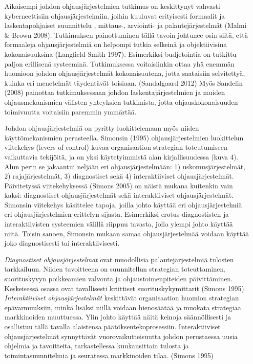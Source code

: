 \documentclass[12pt,a4paper,oneside,pdftex]{report}
\begin{document}
Aikaisempi johdon ohjausjärjestelmien tutkimus on keskittynyt vahvasti kyberneettisiin ohjausjärjestelmiin, joihin kuuluvat erityisesti formaalit ja laskentapohjaiset suunnittelu ,  mittaus-, arviointi- ja palautejärjestelmät (Malmi & Brown 2008). Tutkimuksen painottuminen tällä tavoin johtunee osin siitä, että formaaleja ohjausjärjestelmiä on helpompi tutkia selkeinä ja objektiivisina kokonaisuuksina (Langfield-Smith 1997). Esimerkiksi budjetointia on tutkittu paljon erillisenä systeeminä. Tutkimuksessa voitaisiinkin ottaa yhä enemmän huomioon johdon ohjausjärjestelmät kokonaisuutena, jotta saataisiin selvitettyä, kuinka eri menetelmät täydentävät toisiaan. (Sandalgaard 2012) Myös Sandelin (2008) painottaa tutkimuksessaan johdon laskentajärjestelmien ja muiden ohjausmekanismien välisten yhteyksien tutkimista, jotta ohjauskokonaisuuden toimivuutta voitaisiin paremmin ymmärtää. 

Johdon ohjausjärjestelmiä on pyritty luokittelemaan myös niiden käyttömekanismien perusteella. Simonsin (1995) ohjausjärjestelmien luokittelun viitekehys (levers of control) kuvaa organisaation strategian toteutumiseen vaikuttavia tekijöitä, ja on yksi käytetyimmistä alan kirjallisuudessa (kuva 4). Alun perin se jakaantui neljään eri ohjausjärjestelmään: 1) uskomusjärjestelmät, 2) rajajärjestelmät, 3) diagnostiset sekä 4) interaktiiviset ohjausjärjestelmät. Päivitetyssä viitekehyksessä (Simons 2005) on näistä mukana kuitenkin vain kaksi: diagnostiset ohjausjärjestelmät sekä interaktiiviset ohjausjärjestelmät. Simonsin viitekehys käsittelee tapoja, joilla johto käyttää eri ohjausjärjestelmiä eri ohjausjärjestelmien erittelyn sijasta. Esimerkiksi erotus diagnostisten ja interaktiivisten systeemien välillä riippuu tavasta, jolla ylempi johto käyttää niitä. Toisin sanoen, Simonsin mukaan samaa ohjausjärjestelmää voidaan käyttää joko diagnostisesti tai interaktiivisesti.

\emph{Diagnostiset ohjausjärjestelmät} ovat muodollisia palautejärjestelmiä tulosten tarkkailuun. Niiden tavoitteena on suunnitellun strategian toteuttaminen, suorituskyvyn poikkeamien valvonta ja ohjaustoimenpiteiden päivittäminen. Keskeisessä osassa ovat tavallisesti kriittiset suorituskykymittarit (Simons 1995). \emph{Interaktiiviset ohjausjärjestelmät} keskittävät organisaation huomion strategian epävarmuuksiin, minkä lisäksi niillä voidaan hienosäätää ja muokata strategiaa markkinoiden muuttuessa. Ylin johto käyttää näitä keinoja säännöllisesti ja osallistuu tällä tavalla alaistensa päätöksentekoprosessiin. Interaktiiviset ohjausjärjestelmät synnyttävät vuorovaikutteisuutta johdon perustaessa uusia ohjelmia ja tavoitteita, tarkastellessa kuukausittain tulosta ja toimintasuunnitelmia ja seuratessa markkinoiden tilaa. (Simons 1995)
\end{document}
